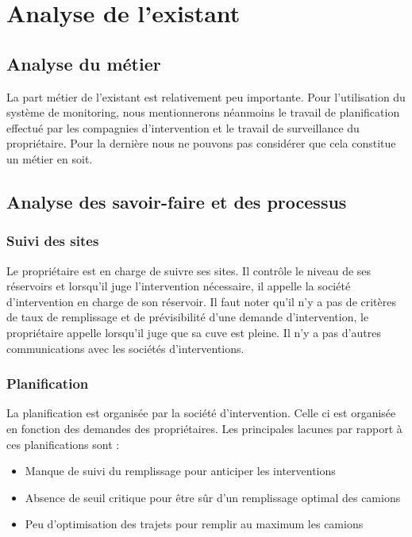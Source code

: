 \section{Analyse de l'existant}

\subsection{Analyse du métier}

La part métier de l'existant est relativement peu importante. Pour l'utilisation du système de monitoring, nous mentionnerons néanmoins le travail de planification effectué par les compagnies d'intervention et le travail de surveillance du propriétaire. Pour la dernière nous ne pouvons pas considérer que cela constitue un métier en soit.

\subsection{Analyse des savoir-faire et des processus}

\subsubsection{Suivi des sites}

Le propriétaire est en charge de suivre ses sites. Il contrôle le niveau de ses réservoirs et lorsqu'il juge l'intervention nécessaire, il appelle la société d'intervention en charge de son réservoir. Il faut noter qu'il n'y a pas de critères de taux de remplissage et de prévisibilité d'une demande d'intervention, le propriétaire appelle lorsqu'il juge que sa cuve est pleine.
Il n'y a pas d'autres communications avec les sociétés d'interventions.


\subsubsection{Planification}

La planification est organisée par la société d'intervention. Celle ci est organisée en fonction des demandes des propriétaires. Les principales lacunes par rapport à ces planifications sont : 
\begin{itemize}
\item Manque de suivi du remplissage pour anticiper les interventions
\item Absence de seuil critique pour être sûr d'un remplissage optimal des camions
\item Peu d'optimisation des trajets pour remplir au maximum les camions
\end{itemize}

